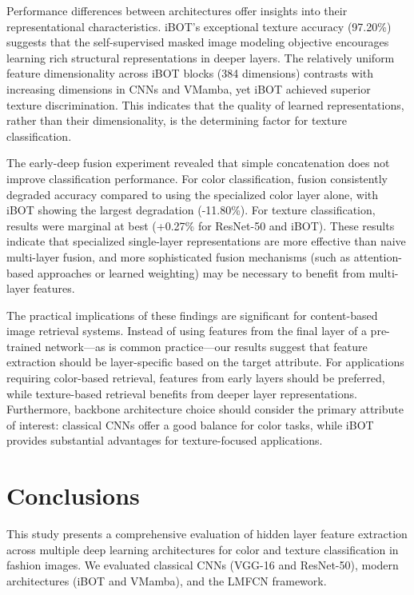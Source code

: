 \documentclass[conference]{IEEEtran}
\begin{document}
Performance differences between architectures offer insights into their representational characteristics. iBOT's exceptional texture accuracy (97.20\%) suggests that the self-supervised masked image modeling objective encourages learning rich structural representations in deeper layers. The relatively uniform feature dimensionality across iBOT blocks (384 dimensions) contrasts with increasing dimensions in CNNs and VMamba, yet iBOT achieved superior texture discrimination. This indicates that the quality of learned representations, rather than their dimensionality, is the determining factor for texture classification.

The early-deep fusion experiment revealed that simple concatenation does not improve classification performance. For color classification, fusion consistently degraded accuracy compared to using the specialized color layer alone, with iBOT showing the largest degradation (-11.80\%). For texture classification, results were marginal at best (+0.27\% for ResNet-50 and iBOT). These results indicate that specialized single-layer representations are more effective than naive multi-layer fusion, and more sophisticated fusion mechanisms (such as attention-based approaches or learned weighting) may be necessary to benefit from multi-layer features.

The practical implications of these findings are significant for content-based image retrieval systems. Instead of using features from the final layer of a pre-trained network---as is common practice---our results suggest that feature extraction should be layer-specific based on the target attribute. For applications requiring color-based retrieval, features from early layers should be preferred, while texture-based retrieval benefits from deeper layer representations. Furthermore, backbone architecture choice should consider the primary attribute of interest: classical CNNs offer a good balance for color tasks, while iBOT provides substantial advantages for texture-focused applications.


\section{Conclusions}

This study presents a comprehensive evaluation of hidden layer feature extraction across multiple deep learning architectures for color and texture classification in fashion images. We evaluated classical CNNs (VGG-16 and ResNet-50), modern architectures (iBOT and VMamba), and the LMFCN framework.
\end{document}
